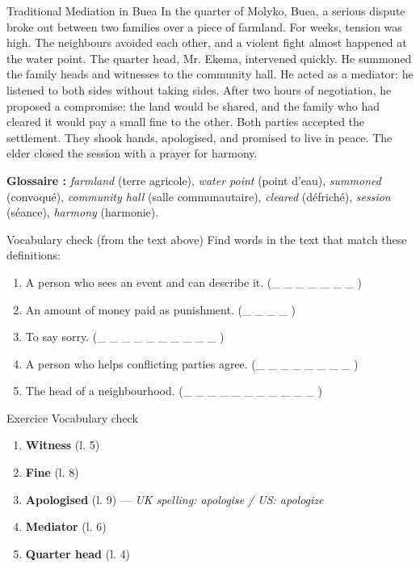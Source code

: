 \documentclass[11pt]{article}
\newcommand{\cle}[1]{{\popxbold\color{popdark}#1}}
\begin{document}
\begin{textebox}{Traditional Mediation in Buea}
In the quarter of Molyko, Buea, a serious \cle{dispute} broke out between two families over a piece of farmland. For weeks, \cle{tension} was high. The \cle{neighbours} avoided each other, and a \cle{violent fight} almost happened at the water point. The \cle{quarter head}, Mr. Ekema, intervened quickly. He summoned the family heads and \cle{witnesses} to the community hall. He acted as a \cle{mediator}: he \cle{listened to both sides} without taking sides. After two hours of \cle{negotiation}, he proposed a \cle{compromise}: the land would be shared, and the family who had cleared it would pay a small \cle{fine} to the other. Both parties \cle{accepted} the \cle{settlement}. They \cle{shook hands}, \cle{apologised}, and promised to \cle{live in peace}. The \cle{elder} closed the session with a prayer for \cle{harmony}.

\vspace{0.3cm}
\noindent\textbf{Glossaire :} \textit{farmland} (terre agricole), \textit{water point} (point d'eau), \textit{summoned} (convoqué), \textit{community hall} (salle communautaire), \textit{cleared} (défriché), \textit{session} (séance), \textit{harmony} (harmonie).
\end{textebox}

\begin{exercice}{Vocabulary check (from the text above)}
Find words in the text that match these definitions:
\begin{enumerate}
    \item A person who sees an event and can describe it. (\_ \_ \_ \_ \_ \_ \_ )
    \item An amount of money paid as punishment. (\_ \_ \_ \_ )
    \item To say sorry. (\_ \_ \_ \_ \_ \_ \_ \_ \_ \_ )
    \item A person who helps conflicting parties agree. (\_ \_ \_ \_ \_ \_ \_ \_ )
    \item The head of a neighbourhood. (\_ \_ \_ \_ \_ \_ \_ \_ \_ \_ \_ )
\end{enumerate}
\end{exercice}

\begin{corrige}{Exercice Vocabulary check}
\begin{enumerate}
    \item \textbf{Witness} (l. 5)
    \item \textbf{Fine} (l. 8)
    \item \textbf{Apologised} (l. 9) — \textit{UK spelling: apologise / US: apologize}
    \item \textbf{Mediator} (l. 6)
    \item \textbf{Quarter head} (l. 4)
\end{enumerate}
\end{corrige}
\end{document}
